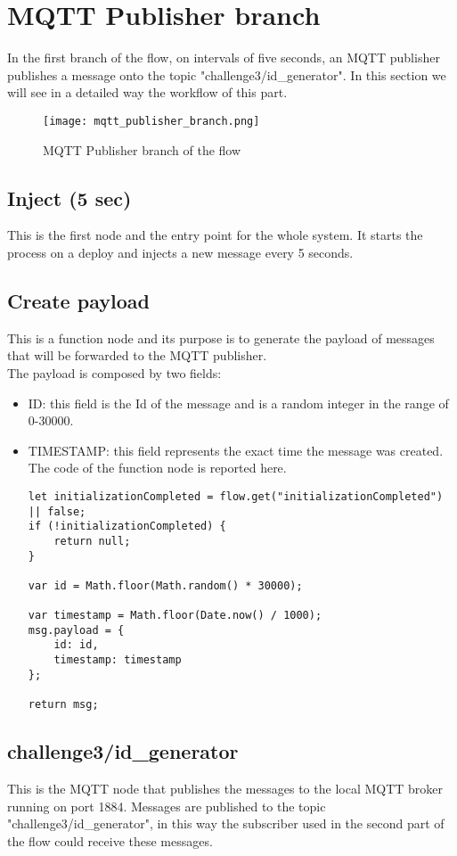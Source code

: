 
\section{MQTT Publisher branch}
\label{sec:publisher_branch}
In the first branch of the flow, on intervals of five seconds, an MQTT publisher publishes a message onto the topic "challenge3/id\_generator". In this section we will see in a detailed way the workflow of this part.
\begin{figure}[H]
    \centering
    \texttt{[image: mqtt\_publisher\_branch.png]}
    \caption{MQTT Publisher branch of the flow}
\end{figure}

\subsection{Inject (5 sec)}
This is the first node and the entry point for the whole system. It starts the process on a deploy and injects a new message every 5 seconds.

\subsection{Create payload}
This is a function node and its purpose is to generate the payload of messages that will be forwarded to the MQTT publisher. \\
The payload is composed by two fields:
\begin{itemize}
\item ID: this field is the Id of the message and is a random integer in the range of 0-30000.
\item TIMESTAMP: this field represents the exact time the message was created.
The code of the function node is reported here.
\begin{verbatim}
let initializationCompleted = flow.get("initializationCompleted") || false;
if (!initializationCompleted) {
    return null;    
}

var id = Math.floor(Math.random() * 30000);

var timestamp = Math.floor(Date.now() / 1000);
msg.payload = {
    id: id,
    timestamp: timestamp
};

return msg;
\end{verbatim}
\end{itemize}


\subsection{challenge3/id\_generator}
This is the MQTT node that publishes the messages to the local MQTT broker running on port 1884. Messages are published to the topic "challenge3/id\_generator", in this way the subscriber used in the second part of the flow could receive these messages.

